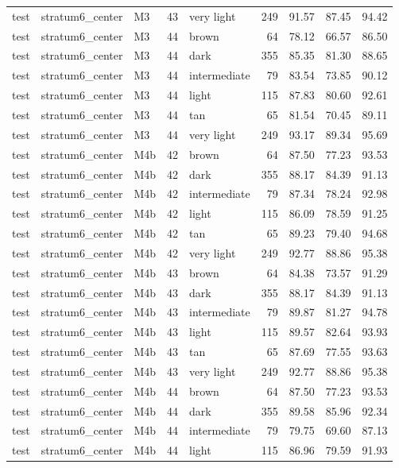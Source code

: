 \begin{tabular}{lllrlrrrr}
test & stratum6\_center & M3 & 43 & very light & 249 & 91.57 & 87.45 & 94.42 \\
test & stratum6\_center & M3 & 44 & brown & 64 & 78.12 & 66.57 & 86.50 \\
test & stratum6\_center & M3 & 44 & dark & 355 & 85.35 & 81.30 & 88.65 \\
test & stratum6\_center & M3 & 44 & intermediate & 79 & 83.54 & 73.85 & 90.12 \\
test & stratum6\_center & M3 & 44 & light & 115 & 87.83 & 80.60 & 92.61 \\
test & stratum6\_center & M3 & 44 & tan & 65 & 81.54 & 70.45 & 89.11 \\
test & stratum6\_center & M3 & 44 & very light & 249 & 93.17 & 89.34 & 95.69 \\
test & stratum6\_center & M4b & 42 & brown & 64 & 87.50 & 77.23 & 93.53 \\
test & stratum6\_center & M4b & 42 & dark & 355 & 88.17 & 84.39 & 91.13 \\
test & stratum6\_center & M4b & 42 & intermediate & 79 & 87.34 & 78.24 & 92.98 \\
test & stratum6\_center & M4b & 42 & light & 115 & 86.09 & 78.59 & 91.25 \\
test & stratum6\_center & M4b & 42 & tan & 65 & 89.23 & 79.40 & 94.68 \\
test & stratum6\_center & M4b & 42 & very light & 249 & 92.77 & 88.86 & 95.38 \\
test & stratum6\_center & M4b & 43 & brown & 64 & 84.38 & 73.57 & 91.29 \\
test & stratum6\_center & M4b & 43 & dark & 355 & 88.17 & 84.39 & 91.13 \\
test & stratum6\_center & M4b & 43 & intermediate & 79 & 89.87 & 81.27 & 94.78 \\
test & stratum6\_center & M4b & 43 & light & 115 & 89.57 & 82.64 & 93.93 \\
test & stratum6\_center & M4b & 43 & tan & 65 & 87.69 & 77.55 & 93.63 \\
test & stratum6\_center & M4b & 43 & very light & 249 & 92.77 & 88.86 & 95.38 \\
test & stratum6\_center & M4b & 44 & brown & 64 & 87.50 & 77.23 & 93.53 \\
test & stratum6\_center & M4b & 44 & dark & 355 & 89.58 & 85.96 & 92.34 \\
test & stratum6\_center & M4b & 44 & intermediate & 79 & 79.75 & 69.60 & 87.13 \\
test & stratum6\_center & M4b & 44 & light & 115 & 86.96 & 79.59 & 91.93 \\

\end{tabular}
